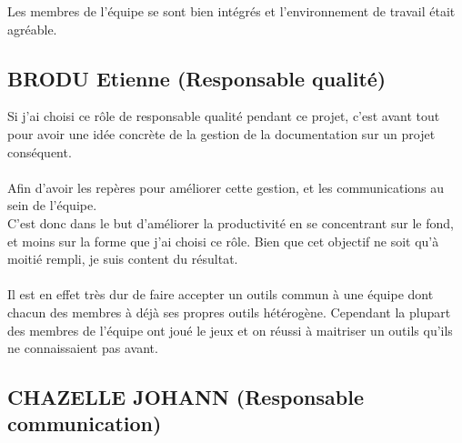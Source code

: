 Les membres de l'équipe se sont bien intégrés et l'environnement de travail était agréable.

       \subsection{BRODU Etienne (Responsable qualité)}

Si j'ai choisi ce rôle de responsable qualité pendant ce projet, c'est avant tout pour avoir une idée concrète de la gestion de la documentation sur un projet conséquent.\\
\\
Afin d'avoir les repères pour améliorer cette gestion, et les communications au sein de l'équipe.\\
C'est donc dans le but d'améliorer la productivité en se concentrant sur le fond, et moins sur la forme que j'ai choisi ce rôle.
Bien que cet objectif ne soit qu'à moitié rempli, je suis content du résultat.\\
\\
Il est en effet très dur de faire accepter un outils commun à une équipe dont chacun des membres à déjà ses propres outils hétérogène.
Cependant la plupart des membres de l'équipe ont joué le jeux et on réussi à maitriser un outils qu'ils ne connaissaient pas avant.

       \subsection{CHAZELLE JOHANN (Responsable communication)}

